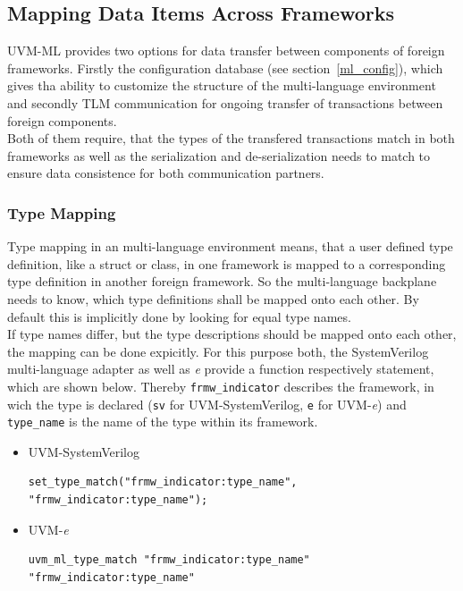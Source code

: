 \subsection{Mapping Data Items Across Frameworks }\label{type_mapping}
UVM-ML provides two options for data transfer between components of foreign frameworks. Firstly the configuration
database (see section~\ref{ml_config}), which gives tha ability to customize the structure of the multi-language
environment and secondly TLM communication for ongoing transfer of transactions between foreign components.\\
Both of them require, that the types of the transfered transactions match in both frameworks as well as the
serialization and de-serialization needs to match to ensure data consistence for both communication partners.

\subsubsection{Type Mapping}
Type mapping in an multi-language environment means, that a user defined type definition, like a struct or class, in
one framework is mapped to a corresponding type definition in another foreign framework. So the multi-language
backplane needs to know, which type definitions shall be mapped onto each other. By default this is implicitly done by
looking for equal type names.\\
If type names differ, but the type descriptions should be mapped onto each other, the mapping can be done expicitly.
For this purpose both, the SystemVerilog multi-language adapter as well as \textit{e} provide a function respectively
statement, which are shown below. Thereby \lstinline$frmw_indicator$ describes the framework, in wich the type is
declared (\lstinline$sv$ for UVM-SystemVerilog, \lstinline$e$ for UVM-\textit{e}) and \lstinline$type_name$ is the name
of the type within its framework.
\begin{itemize}
  \item{UVM-SystemVerilog}
\begin{lstlisting}
set_type_match("frmw_indicator:type_name", "frmw_indicator:type_name");
\end{lstlisting} 
  \item{UVM-\textit{e}}
\begin{lstlisting}
uvm_ml_type_match "frmw_indicator:type_name" "frmw_indicator:type_name"
\end{lstlisting} 
\end{itemize}

